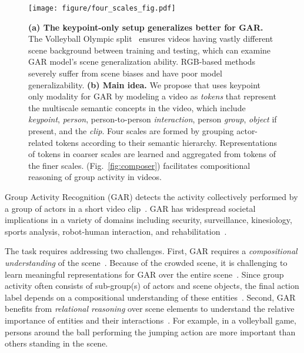 \documentclass[runningheads]{llncs}
\begin{document}
 
\begin{figure}[t]
\centering
	\texttt{[image: figure/four\_scales\_fig.pdf]}
    \caption{\textbf{(a) The keypoint-only setup generalizes better for GAR.} The Volleyball Olympic split~\cite{POGARS} ensures videos having vastly different scene background between training and testing, which can examine GAR model's scene generalization ability. RGB-based methods severely suffer from scene biases and have poor model generalizability. 
\textbf{(b) Main idea.} We propose \ours 
that uses keypoint only modality
for GAR 
by modeling a 
video
as 
\textit{tokens} that represent the multiscale semantic concepts in the video, which include \textit{keypoint}, \textit{person}, person-to-person \textit{interaction}, person \textit{group}, \textit{object} if present, and the 
\textit{clip}.
Four scales are formed by grouping actor-related tokens according to their semantic hierarchy.   
Representations of tokens in coarser scales are learned and aggregated from tokens of the finer scales.
\ours (Fig.~\ref{fig:composer}) facilitates compositional reasoning of group activity in videos. 
}
\label{fig:four_scales}
\end{figure} 
Group Activity Recognition (GAR) detects
the activity collectively performed by a group of actors 
in a short video clip~\cite{choi2013understanding,wu2021comprehensive}.  
GAR has widespread societal implications in a variety of domains including security, surveillance, kinesiology, sports analysis, robot-human interaction, and rehabilitation~\cite{actor-transformer,pramono2020empowering,yuan2021spatio,ehsanpour2020joint}. 


The task requires addressing two challenges.
First, GAR requires a \textit{compositional understanding}
of the scene~\cite{abkenar2019groupsense}.
Because of the crowded scene, it is challenging to learn meaningful representations for GAR over the entire scene~\cite{wu2021comprehensive}. 
Since group activity often consists of
sub-group(s) of actors and scene objects, the final action label depends on a 
compositional understanding of these entities~\cite{wu2021comprehensive,yuan2021learning}.
Second, GAR benefits from \textit{relational reasoning} over scene elements to understand the relative importance of entities and their interactions~\cite{prl,sam}. For example, in a volleyball game,
persons around the ball performing the jumping action are more important than others standing in the scene. 
\end{document}
